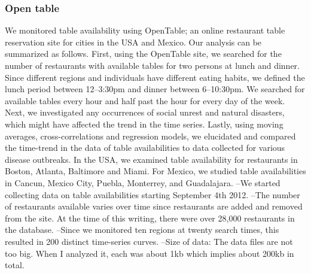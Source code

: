 \subsubsection{Open table}
We monitored table availability using OpenTable; an online restaurant
table reservation site for cities in the USA and Mexico. Our analysis
can be summarized as follows. First, using the OpenTable site, we
searched for the number of restaurants with available tables for two
persons at lunch and dinner. Since different regions and individuals
have different eating habits, we defined the lunch period between
12–3:30pm and dinner between 6–10:30pm. We searched for available tables
every hour and half past the hour for every day of the week. Next, we
investigated any occurrences of social unrest and natural disasters,
which might have affected the trend in the time series. Lastly, using
moving averages, cross-correlations and regression models, we elucidated
and compared the time-trend in the data of table availabilities to data
collected for various disease outbreaks. In the USA, we examined table
availability for restaurants in Boston, Atlanta, Baltimore and Miami.
For Mexico, we studied table availabilities in Cancun, Mexico City,
Puebla, Monterrey, and Guadalajara.
--We started collecting data on table availabilities starting September
4th 2012.
--The number of restaurants available varies over time since restaurants
are added and removed from the site. At the time of this writing, there
were over 28,000 restaurants in the database.
--Since we monitored ten regions at twenty search times, this resulted
in 200 distinct time-series curves.
--Size of data: The data files are not too big. When I analyzed it, each
was about 1kb which implies about 200kb in total.


